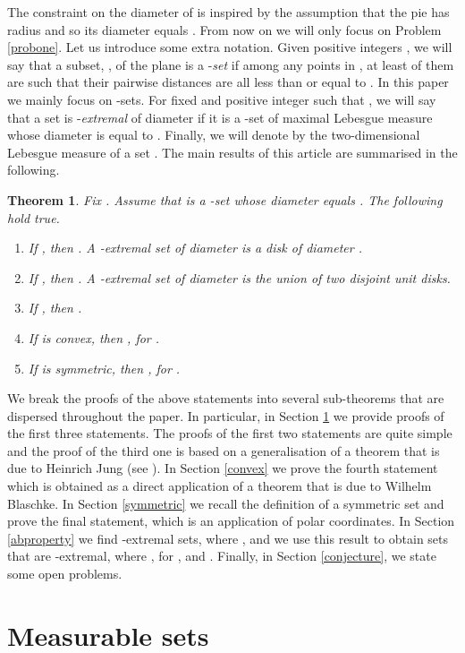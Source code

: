 \documentclass[12pt]{article}
\newtheorem{thm}{Theorem}[section]
\begin{document}
The constraint on the diameter of  is inspired by the assumption that the pie has radius  
and so its diameter equals . 
From now on we will only focus on Problem \ref{probone}. 
Let us introduce some extra notation.  
Given positive integers , we will say that a subset, , 
of the plane is a -\emph{set} if 
among any  points in , at least  of them 
are such that their pairwise distances are all less than or equal to .
In this paper we mainly focus on -sets. 
For fixed  and positive integer  such that , 
we will say that a set  is -\emph{extremal} of diameter  if it 
is a -set of maximal Lebesgue measure 
whose diameter is equal to . 
Finally, we will denote by  the two-dimensional Lebesgue measure of a set .
The main results of this article are summarised in the following. 

\begin{thm}\label{main} Fix . Assume that  is a -set 
whose diameter equals . 
The following hold true.
\begin{enumerate}
\item If , then . A -extremal set 
of diameter  is 
a disk of diameter .
\item  If , then . A -extremal set of diameter 
 is the union of two disjoint unit disks. 
\item  If , then .
\item If   is \emph{convex}, then 
, for .
\item If  is \emph{symmetric}, then , for .
\end{enumerate}
\end{thm} 

We break the proofs of the above statements into several sub-theorems that are dispersed  throughout the paper. 
In particular, in Section \ref{general} we  provide proofs of the first three statements. 
The proofs of the first two statements are quite simple and the proof of the third one is 
based on a generalisation of a theorem that is due to Heinrich Jung (see \cite{Jung}). 
In Section \ref{convex} we prove the fourth statement which is obtained as a direct application 
of a theorem that is due to Wilhelm Blaschke. In Section \ref{symmetric} we recall the definition 
of a symmetric set and  prove the final statement, which is
an application of polar coordinates. 
In Section \ref{abproperty}  we find
-extremal sets, where , and we use this result to obtain sets that are
-extremal, where , for , and .
Finally, in Section \ref{conjecture}, we state some 
open problems.


\section{Measurable sets}\label{general}
\end{document}
